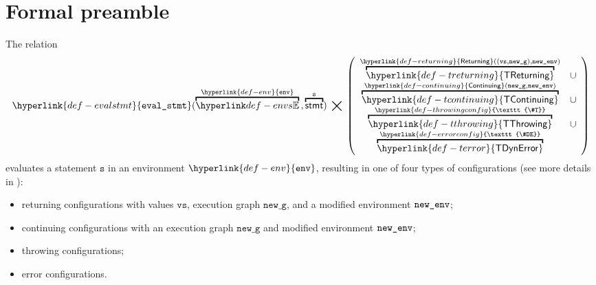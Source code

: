\documentclass{book}
\newcommand\ThrowingConfig[0]{\hyperlink{def-throwingconfig}{\texttt{\#T}}}
\newcommand\ErrorConfig[0]{\hyperlink{def-errorconfig}{\texttt{\#DE}}}
\newcommand\TError[0]{\hyperlink{def-terror}{\textsf{TDynError}}}
\newcommand\TThrowing[0]{\hyperlink{def-tthrowing}{\textsf{TThrowing}}}
\newcommand\TContinuing[0]{\hyperlink{def-tcontinuing}{\textsf{TContinuing}}}
\newcommand\TReturning[0]{\hyperlink{def-treturning}{\textsf{TReturning}}}
\newcommand\evalstmt[1]{\hyperlink{def-evalstmt}{\texttt{eval\_stmt}}(#1)}
\newcommand\Continuing[0]{\hyperlink{def-continuing}{\textsf{Continuing}}}
\newcommand\Returning[0]{\hyperlink{def-returning}{\textsf{Returning}}}
\newcommand\env[0]{\hyperlink{def-env}{\texttt{env}}}
\newcommand\newg[0]{\texttt{new\_g}}
\newcommand\vs[0]{\texttt{s}}
\newcommand\vvs[0]{\texttt{vs}}
\begin{document}
\section{Formal preamble}

The relation
\hypertarget{def-evalstmt}{}
\[
  \evalstmt{\overname{\envs}{\env} \aslsep \overname{\stmt}{\vs}} \;\aslrel\;
  \left(
  \begin{array}{cl}
  \overname{\TReturning}{\Returning((\vvs,\newg), \newenv)} & \cup\\
  \overname{\TContinuing}{\Continuing(\newg,\newenv)} & \cup\\
  \overname{\TThrowing}{\ThrowingConfig} & \cup \\
  \overname{\TError}{\ErrorConfig} &
  \end{array}
  \right)
\]
evaluates a statement $\vs$ in an environment $\env$, resulting in one of four types of configurations
(see more details in ):
\begin{itemize}
  \item returning configurations with values $\vvs$, execution graph $\newg$, and a modified environment $\texttt{new\_env}$;
  \item continuing configurations with an execution graph $\newg$ and modified environment $\texttt{new\_env}$;
  \item throwing configurations;
  \item error configurations.
\end{itemize}
\end{document}
